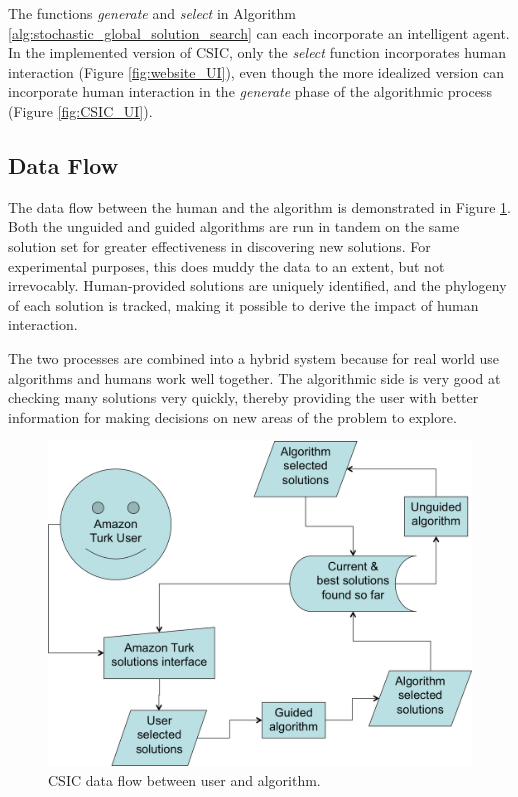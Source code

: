 The functions \emph{generate} and \emph{select} in Algorithm \ref{alg:stochastic_global_solution_search} can each incorporate an intelligent agent.  In the implemented version of CSIC, only the \emph{select} function incorporates human interaction (Figure \ref{fig:website_UI}), even though the more idealized version can incorporate human interaction in the \emph{generate} phase of the algorithmic process (Figure \ref{fig:CSIC_UI}).  

\subsection{Data Flow}
The data flow between the human and the algorithm is demonstrated in Figure \ref{fig:data_flow}.  Both the unguided and guided algorithms are run in tandem on the same solution set for greater effectiveness in discovering new solutions.  For experimental purposes, this does muddy the data to an extent, but not irrevocably.  Human-provided solutions are uniquely identified, and the phylogeny of each solution is tracked, making it possible to derive the impact of human interaction.  

The two processes are combined into a hybrid system because for real world use algorithms and humans work well together.  The algorithmic side is very good at checking many solutions very quickly, thereby providing the user with better information for making decisions on new areas of the problem to explore.

\begin{figure}[!t]
  \centering
  \includegraphics[width=4.5in]{HollowayDataFlow}
  \caption{CSIC data flow between user and algorithm.}
  \label{fig:data_flow}
\end{figure}

